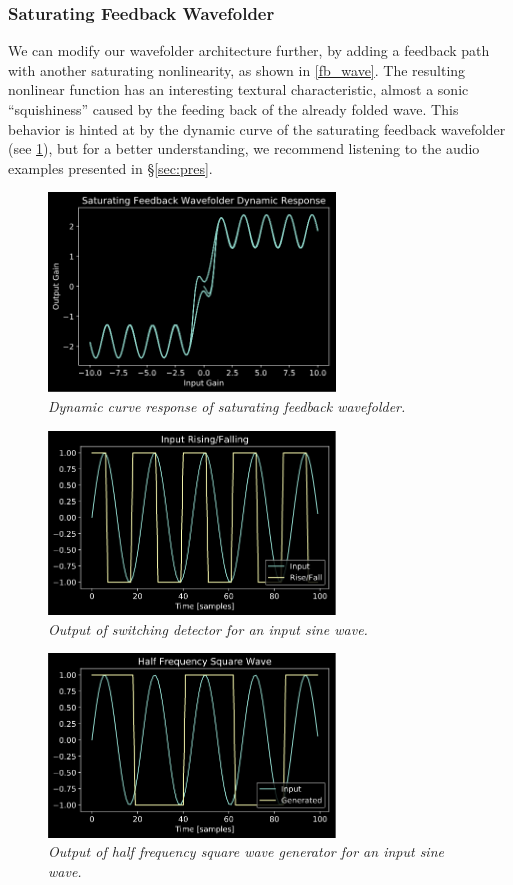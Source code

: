 \documentclass[twoside,a4paper]{article}
\begin{document}
\subsubsection{Saturating Feedback Wavefolder}
%
We can modify our wavefolder architecture further, by adding a
feedback path with another saturating nonlinearity, as shown in
\cref{fb_wave}. The resulting nonlinear function has an interesting
textural characteristic, almost a sonic ``squishiness'' caused by the
feeding back of the already folded wave. This behavior is hinted at by
the dynamic curve of the saturating feedback wavefolder
(see \cref{fb_dyn}), but for a better understanding, we recommend
listening to the audio examples presented in \S\ref{sec:pres}.
%
\begin{figure}[!htb]
    \center
    \includegraphics[width=3in]{../Wavefolder/Pics/fb_dyn.png}
    \caption{\label{fb_dyn}{\it Dynamic curve response of saturating feedback wavefolder.}}
\end{figure}
%
\begin{figure}[!htb]
    \center
    \includegraphics[width=3in]{../Subharmonics/Pics/rise_fall.png}
    \caption{\label{square_full}{\it Output of switching detector for an input sine wave.}}
\end{figure}
%
\begin{figure}[!htb]
    \center
    \includegraphics[width=3in]{../Subharmonics/Pics/half_square.png}
    \caption{\label{square_half}{\it Output of half frequency square wave generator for an input sine wave.}}
\end{figure}
\end{document}
